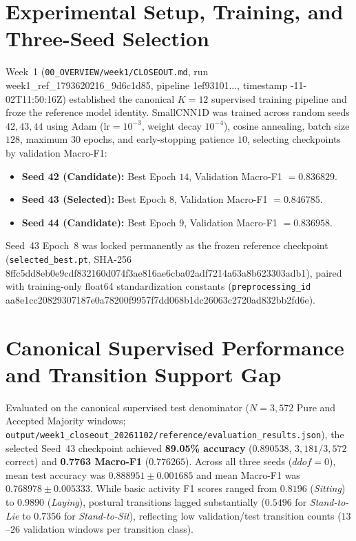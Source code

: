 \documentclass[11pt,oneside,a4paper]{report}
\newcommand{\code}[1]{{\small\upshape\ttfamily #1}}
\newcommand{\pathcode}[1]{{\small\upshape\ttfamily\nolinkurl{#1}}}
\theoremstyle{remark}
\begin{document}
\section{Experimental Setup, Training, and Three-Seed Selection}
Week~1 (\nolinkurl{00_OVERVIEW/week1/CLOSEOUT.md}, run \code{week1\_ref\_1793620216\_9d6c1d85}, pipeline \code{1ef93101...}, timestamp \code{2026-11-02T11:50:16Z}) established the canonical $K=12$ supervised training pipeline and froze the reference model identity. \code{SmallCNN1D} was trained across random seeds $42, 43, 44$ using Adam ($\text{lr}=10^{-3}$, weight decay $10^{-4}$), cosine annealing, batch size $128$, maximum $30$ epochs, and early-stopping patience $10$, selecting checkpoints by validation Macro-F1:
\begin{itemize}[leftmargin=1.5em]
  \item \textbf{Seed 42 (Candidate):} Best Epoch $14$, Validation Macro-F1 $= 0.836829$.
  \item \textbf{Seed 43 (Selected):} Best Epoch $8$, Validation Macro-F1 $= 0.846785$.
  \item \textbf{Seed 44 (Candidate):} Best Epoch $9$, Validation Macro-F1 $= 0.836958$.
\end{itemize}
Seed~43 Epoch~8 was locked permanently as the frozen reference checkpoint (\pathcode{selected_best.pt}, SHA-256 \code{8ffc5dd8eb0e9cdf832160d074f3ae81\allowbreak 6ae6cba02adf7214a63a8b623303adb1}), paired with training-only \code{float64} standardization constants (\pathcode{preprocessing_id} \code{aa8e1cc20829307187e0a78200f9957f\allowbreak 7dd068b1dc26063c2720ad832bb2fd6e}).

\section{Canonical Supervised Performance and Transition Support Gap}
Evaluated on the canonical supervised test denominator ($N=3,572$ Pure and Accepted Majority windows; \nolinkurl{output/week1_closeout_20261102/reference/evaluation_results.json}), the selected Seed~43 checkpoint achieved \textbf{89.05\% accuracy} ($0.890538$, $3,181/3,572$ correct) and \textbf{0.7763 Macro-F1} ($0.776265$). Across all three seeds ($ddof=0$), mean test accuracy was $0.888951 \pm 0.001685$ and mean Macro-F1 was $0.768978 \pm 0.005333$. While basic activity F1 scores ranged from $0.8196$ (\textit{Sitting}) to $0.9890$ (\textit{Laying}), postural transitions lagged substantially ($0.5496$ for \textit{Stand-to-Lie} to $0.7356$ for \textit{Stand-to-Sit}), reflecting low validation/test transition counts ($13$--$26$ validation windows per transition class).
\end{document}
